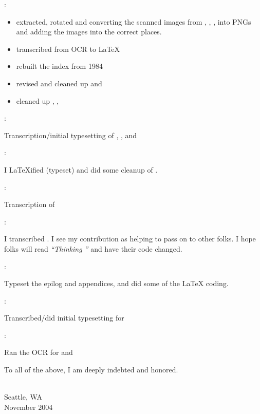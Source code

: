 \begin{interview*}
:
\begin{tfquot}
\begin{itemize}
\item extracted, rotated and converting the scanned images from
  , , ,  into PNGs and adding the
  images into the correct places.
  
\item transcribed  from OCR to \LaTeX{}

\item rebuilt the index from 1984

\item revised and cleaned up  and 

\item cleaned up , , 
\end{itemize}
\end{tfquot}
\end{interview*}
\begin{interview}
:
\begin{tfquot}
Transcription/initial typesetting of , , and 
\end{tfquot}
\end{interview}
\begin{interview*}
:
\begin{tfquot}
I \LaTeX{}ified (typeset) and did some cleanup of .
\end{tfquot}
\end{interview*}
\begin{interview*}
:
\begin{tfquot}
Transcription of 
\end{tfquot}
\end{interview*}
\begin{interview*}
:
\begin{tfquot}
I transcribed . I see my contribution as helping to pass on
\Forth{} to other folks.  I hope folks will read \emph{``Thinking
\Forth{}''} and have their code changed.
\end{tfquot}
\end{interview*}
\begin{interview*}
:
\begin{tfquot}
Typeset the epilog and appendices, and did some of the \LaTeX{} coding.
\end{tfquot}
\end{interview*}
\begin{interview*}
:
\begin{tfquot}
Transcribed/did initial typesetting for 
\end{tfquot}
\end{interview*}
\begin{interview*}
:
\begin{tfquot}
Ran the OCR for  and 
\end{tfquot}
\end{interview*}
To all of the above, I am deeply indebted and honored.

\begin{flushright}
    \\
   Seattle, WA \\
   November 2004
\end{flushright}
